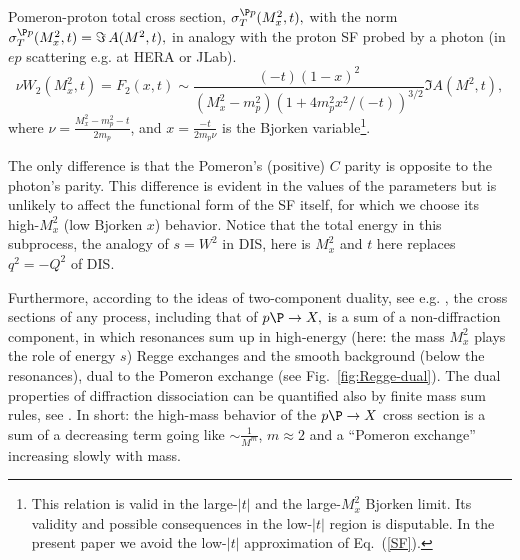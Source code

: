 \documentclass[12pt]{article}
\begin{document}
Pomeron-proton total cross section, $\sigma_T^{\P p}(M^2_x, t),$ with the norm $\sigma_T^{\P p}(M^2_x, t)=\Im\, A(M^2,t),$
in analogy with the proton SF probed by a photon (in $ep$ scattering e.g. at HERA or JLab).
\begin{equation}
 \label{SF}
   \nu W_2(M_x^2,t)=F_2(x,t)\sim \frac{(-t)(1-x)^2}{(M_x^2-m_p^2)(1+4m_p^2x^2/(-t))^{3/2}}\Im A(M^2,t),
\end{equation}
where $\nu=\frac{M_x^2-m_p^2-t}{2m_p}$, and $x=\frac{-t}{2m_p\nu}$ is the Bjorken variable\footnote{This relation is valid in the large-$|t|$ and the large-$M_x^2$ Bjorken limit. Its validity and possible consequences in the low-$|t|$ region is disputable. In the present paper we avoid the low-$|t|$ approximation of Eq.~(\ref{SF}).}.


The only difference is that the Pomeron's (positive) $C$ parity is opposite to the photon's parity. This difference is evident in the values of the parameters but is unlikely to affect the functional form of the SF itself, for which we choose its high-$M_x^2$ (low Bjorken $x$) behavior. Notice that the total energy in this subprocess, the analogy of $s=W^2$ in DIS, here is $M^2_x$ and $t$ here replaces $q^2=-Q^2$ of DIS.

Furthermore, according to the ideas of two-component duality, see e.g. \cite{JPsi}, the cross sections of any process, including that of $p\P\rightarrow X,$ is a sum of a non-diffraction component, in which resonances sum up in high-energy (here: the mass $M^2_x$ plays the role of energy $s$) Regge exchanges and the smooth background (below the resonances), dual to the Pomeron exchange (see Fig.~\ref{fig:Regge-dual}). The dual properties of diffraction dissociation can be quantified also by finite mass sum rules, see \cite{Goulianos}. In short: the high-mass behavior of the $p\P\rightarrow X$ cross section is a sum of a decreasing term going like $\sim \frac{1}{M^m}$, $m\approx 2$ and a ``Pomeron exchange'' increasing slowly with mass. 
\end{document}
